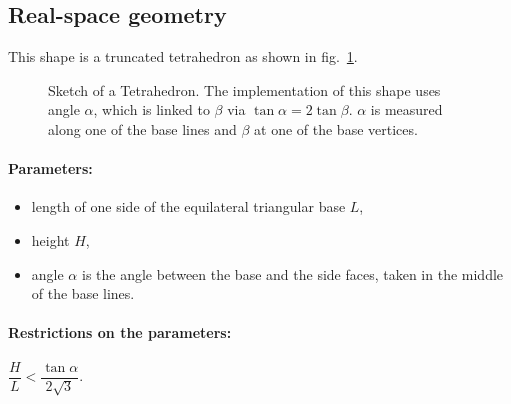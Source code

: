 \subsection{Real-space geometry}
This shape is a truncated tetrahedron as shown in fig.~\ref{fig:tetrahedron}.

\begin{figure}[ht]
\hfill
{}
\hfill
{}
\hfill
\caption{Sketch of a Tetrahedron. The implementation of this shape uses angle
  $\alpha$, which is linked to $\beta$ via $\tan \alpha = 2 \tan 
  \beta$. $\alpha$ is measured along one of the base lines and $\beta$
  at one of the base vertices.}
\label{fig:tetrahedron}
\end{figure}

\FloatBarrier

\paragraph{Parameters:}
\begin{itemize}
\item length of one side of the equilateral triangular base $L$,
\item height $H$,
\item angle $\alpha$ is the angle between the base and the
  side faces, taken in the middle of the base lines.
\end{itemize}

\paragraph{Restrictions on the parameters:} $\dfrac{H}{L}< \dfrac{\tan{\alpha}}{2\sqrt{3}}$.

